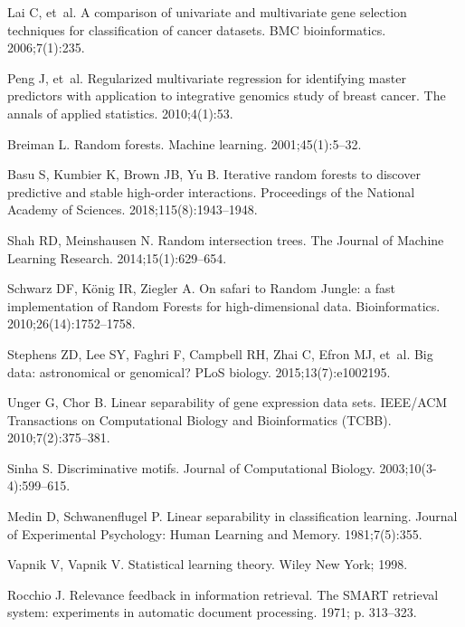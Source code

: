 \documentclass[10pt,letterpaper]{article}
\begin{document}
\begin{thebibliography}{10}
Lai C, et~al.
\newblock A comparison of univariate and multivariate gene selection techniques
  for classification of cancer datasets.
\newblock BMC bioinformatics. 2006;7(1):235.

Peng J, et~al.
\newblock Regularized multivariate regression for identifying master predictors
  with application to integrative genomics study of breast cancer.
\newblock The annals of applied statistics. 2010;4(1):53.

Breiman L.
\newblock Random forests.
\newblock Machine learning. 2001;45(1):5--32.

Basu S, Kumbier K, Brown JB, Yu B.
\newblock Iterative random forests to discover predictive and stable high-order
  interactions.
\newblock Proceedings of the National Academy of Sciences.
  2018;115(8):1943--1948.

Shah RD, Meinshausen N.
\newblock Random intersection trees.
\newblock The Journal of Machine Learning Research. 2014;15(1):629--654.

Schwarz DF, K{\"o}nig IR, Ziegler A.
\newblock On safari to Random Jungle: a fast implementation of Random Forests
  for high-dimensional data.
\newblock Bioinformatics. 2010;26(14):1752--1758.

Stephens ZD, Lee SY, Faghri F, Campbell RH, Zhai C, Efron MJ, et~al.
\newblock Big data: astronomical or genomical?
\newblock PLoS biology. 2015;13(7):e1002195.

Unger G, Chor B.
\newblock Linear separability of gene expression data sets.
\newblock IEEE/ACM Transactions on Computational Biology and Bioinformatics
  (TCBB). 2010;7(2):375--381.

Sinha S.
\newblock Discriminative motifs.
\newblock Journal of Computational Biology. 2003;10(3-4):599--615.

Medin D, Schwanenflugel P.
\newblock Linear separability in classification learning.
\newblock Journal of Experimental Psychology: Human Learning and Memory.
  1981;7(5):355.

Vapnik V, Vapnik V.
\newblock Statistical learning theory.
\newblock Wiley New York; 1998.

Rocchio J.
\newblock Relevance feedback in information retrieval.
\newblock The SMART retrieval system: experiments in automatic document
  processing. 1971; p. 313--323.


\end{thebibliography}
\end{document}
